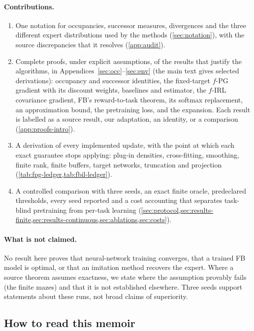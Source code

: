\paragraph{Contributions.}
\begin{enumerate}[nosep,label=(\roman*)]
\item One notation for occupancies, successor measures, divergences and the three different expert distributions used by the methods (\cref{sec:notation}), with the source discrepancies that it resolves (\cref{app:audit}).
\item Complete proofs, under explicit assumptions, of the results that justify the algorithms, in Appendices~\ref{sec:occ}--\ref{sec:env} (the main text gives selected derivations): occupancy and successor identities, the fixed-target $f$-PG gradient with its discount weights, baselines and estimator, the $f$-IRL covariance gradient, FB's reward-to-task theorem, its softmax replacement, an approximation bound, the pretraining loss, and the \DMFB{} expansion. Each result is labelled as a source result, our adaptation, an identity, or a comparison (\cref{app:proofs-intro}).
\item A derivation of every implemented update, with the point at which each exact guarantee stops applying: plug-in densities, cross-fitting, smoothing, finite rank, finite buffers, target networks, truncation and projection (\cref{tab:fpg-ledger,tab:fbil-ledger}).
\item A controlled comparison with three seeds, an exact finite oracle, predeclared thresholds, every seed reported and a cost accounting that separates task-blind pretraining from per-task learning (\cref{sec:protocol,sec:results-finite,sec:results-continuous,sec:ablations,sec:costs}).
\end{enumerate}

\paragraph{What is not claimed.}
No result here proves that neural-network training converges, that a trained FB model is optimal, or that an imitation method recovers the expert.
Where a source theorem assumes exactness, we state where the assumption provably fails (the finite mazes) and that it is not established elsewhere.
Three seeds support statements about these runs, not broad claims of superiority.

\subsection{How to read this memoir}

